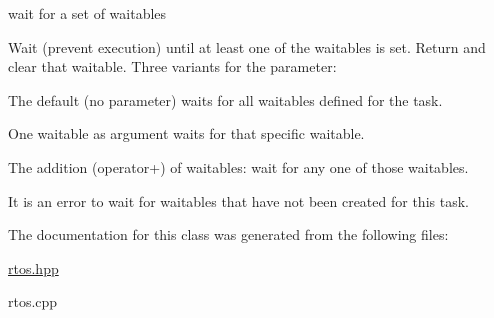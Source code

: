wait for a set of waitables 

Wait (prevent execution) until at least one of the waitables is set. Return and clear that waitable. Three variants for the parameter\+:


\begin{DoxyItemize}
\item The default (no parameter) waits for all waitables defined for the task.
\item One waitable as argument waits for that specific waitable.
\item The addition (operator+) of waitables\+: wait for any one of those waitables.
\end{DoxyItemize}

It is an error to wait for waitables that have not been created for this task. 

The documentation for this class was generated from the following files\+:\begin{DoxyCompactItemize}
\item 
\hyperlink{rtos_8hpp}{rtos.\+hpp}\item 
rtos.\+cpp\end{DoxyCompactItemize}

